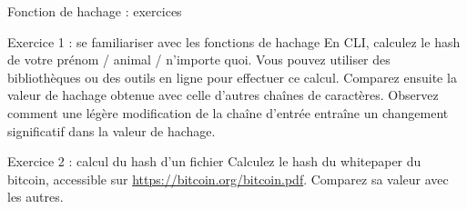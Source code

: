 \begin{frame}{Fonction de hachage : exercices}
  \begin{block}{Exercice 1 : se familiariser avec les fonctions de hachage}
    En CLI, calculez le hash de votre prénom / animal / n'importe quoi.
    Vous pouvez utiliser des bibliothèques ou des outils en ligne pour effectuer ce calcul.
    Comparez ensuite la valeur de hachage obtenue avec celle d'autres chaînes de caractères.
    Observez comment une légère modification de la chaîne d'entrée entraîne un changement significatif dans la valeur de hachage.
  \end{block}

  \begin{block}{Exercice 2 : calcul du hash d'un fichier}
    Calculez le hash du whitepaper du bitcoin, accessible sur \url{https://bitcoin.org/bitcoin.pdf}.
    Comparez sa valeur avec les autres.
  \end{block}
\end{frame}